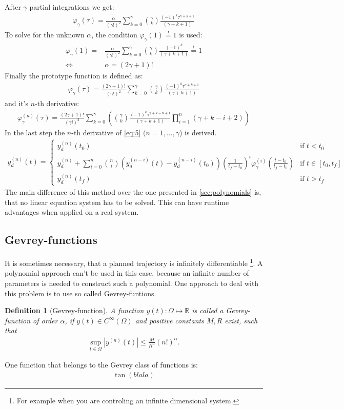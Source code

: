\documentclass[a4paper,11pt,headings=standardclasses,parskip=half]{scrartcl}
\newtheorem{defi}{Definition}[section]
\newcommand{\R}{\mathbb{R}} %
\begin{document}
After $\gamma$ partial integrations we get:
\begin{align*}
\varphi_\gamma(\tau)= \frac{\alpha}{(\gamma!)^2} \sum_{k=0}^{\gamma} \binom{\gamma}{k} \frac{(-1)^k\tau^{\gamma+k+1}}{(\gamma+k+1)}
\end{align*}
To solve for the unknown $\alpha$, the  condition $\varphi_\gamma(1)\overset{!}{=}1$ is used:
\begin{align*}
\varphi_\gamma(1)= &\frac{\alpha}{(\gamma!)^2} \sum_{k=0}^{\gamma} \binom{\gamma}{k} \frac{(-1)^k}{(\gamma+k+1)} \overset{!}{=} 1 \\
\Leftrightarrow \quad & \alpha = (2\gamma+1)!
\end{align*}
Finally the prototype function is defined as:
\begin{align}
\varphi_\gamma(\tau)= \frac{(2\gamma+1)!}{(\gamma!)^2} \sum_{k=0}^{\gamma} \binom{\gamma}{k} \frac{(-1)^k\tau^{\gamma+k+1}}{(\gamma+k+1)}
\end{align}
and it's $n$-th derivative:
\begin{align}
\varphi_\gamma^{(n)}(\tau)= \frac{(2\gamma+1)!}{(\gamma!)^2} \sum_{k=0}^{\gamma} \left(\binom{\gamma}{k} \frac{(-1)^k\tau^{\gamma+k-n+1}}{(\gamma+k+1)}\prod_{i=1}^n(\gamma+k-i+2)\right)
\end{align}
In the last step the $n$-th derivative of \eqref{eq:5} $(n=1,...,\gamma$) is derived.
\begin{align}
y_d^{(n)}(t) = \begin{cases} y_d^{(n)}(t_0) & \textrm{if } t<t_0 \\ 
y_d^{(n)} + \sum_{i=0}^{n}\binom{n}{i}(y_d^{(n-i)}(t)-y_d^{(n-i)}(t_0))\left(\frac{1}{t_f-t_0}\right)^i\varphi_\gamma^{(i)}\left(\frac{t-t_0}{t_f-t_0}\right) &\textrm{if } t \in [t_0, t_f] \\ 
y_d^{(n)}(t_f)&\textrm{if } t>t_f\end{cases}
\end{align}
The main difference of this method over the one presented in \ref{sec:polynomials} is, that no linear equation system has to be solved. This can have runtime advantages when applied on a real system.
\subsection{Gevrey-functions}
It is sometimes necessary, that a planned trajectory is infinitely differentiable \footnote{For example when you are controling an infinite dimensional system.}. A polynomial approach can't be used in this case, because an infinite number of parameters is needed to construct such a polynomial. One approach to deal with this problem is to use so called Gevrey-funtions.
\begin{defi}[Gevrey-function] A function $y(t):\Omega \mapsto \R$ is called a Gevrey-function of order $\alpha$, if $y(t) \in C^\infty(\Omega)$ and positive constants $M, R$ exist, such that
\begin{align*}
\sup_{t\in\Omega}{|y^{(n)}(t)| \leq \frac{M}{R^n}(n!)^\alpha}.
\end{align*}
\end{defi}
One function that belongs to the Gevrey class of functions is:
\begin{align}
\tan(blala)
\end{align}
\end{document}
